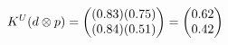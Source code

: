 \documentclass[preview]{standalone}
\begin{document}
\begin{align*}
\special{dvisvgm:raw <g id='unique000'>}K^U(d \otimes p) = \begin{pmatrix} (0.83)(0.75) \\ (0.84)(0.51) \end{pmatrix} = \begin{pmatrix} 0.62 \\ 0.42 \end{pmatrix}\special{dvisvgm:raw </g>}
\end{align*}
\end{document}
